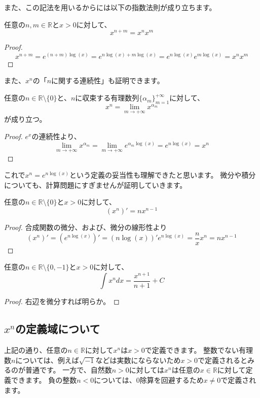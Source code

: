 また、この記法を用いるからには以下の指数法則が成り立ちます。
\begin{theorem}
  任意の$n,m\in\mathbb{R}$と$x>0$に対して、
  \[
    x^{n+m}=x^nx^m
  \]
\end{theorem}
\begin{proof}
  \[x^{n+m}=e^{(n+m)\log(x)}=e^{n\log(x)+m\log(x)}=e^{n\log(x)}e^{m\log(x)}=x^nx^m\]
\end{proof}

また、$x^n$の「$n$に関する連続性」も証明できます。
\begin{theorem}
  任意の$n\in\mathbb{R}\setminus\{0\}$と、$n$に収束する有理数列$\{\alpha_m\}_{m=1}^{+\infty}$に対して、
  \[
    x^n=\lim_{m\to+\infty}x^{\alpha_m}
  \]
  が成り立つ。
\end{theorem}
\begin{proof}
  $e^x$の連続性より、
  \[\lim_{m\to+\infty}x^{\alpha_m}=\lim_{m\to+\infty}e^{\alpha_m\log(x)}=e^{n\log(x)}=x^n\]
\end{proof}

これで$x^n=e^{n\log(x)}$という定義の妥当性も理解できたと思います。
微分や積分についても、計算問題にすぎませんが証明していきます。
\begin{theorem}
  任意の$n\in\mathbb{R}\setminus\{0\}$と$x>0$に対して、
  \[(x^n)'=nx^{n-1}\]
\end{theorem}
\begin{proof}
  合成関数の微分、および、微分の線形性より
  \[
    (x^n)'=(e^{n\log(x)})'=(n\log(x))'e^{n\log(x)}=\frac{n}{x}x^n=nx^{n-1}
  \]
\end{proof}

\begin{theorem}
  任意の$n\in\mathbb{R}\setminus\{0,-1\}$と$x>0$に対して、
  \[\int x^n dx=\frac{x^{n+1}}{n+1}+C\]
\end{theorem}
\begin{proof}
  右辺を微分すれば明らか。
\end{proof}

\subsection{$x^n$の定義域について}

上記の通り、任意の$n\in\mathbb{R}$に対して$x^n$は$x>0$で定義できます。
整数でない有理数$n$については、例えば$\sqrt{-1}$などは実数にならないため$x>0$で定義されるとみるのが普通です。
一方で、自然数$n>0$に対しては$x^n$は任意の$x\in\mathbb{R}$に対して定義できます。
負の整数$n<0$については、0除算を回避するため$x\neq0$で定義されます。

